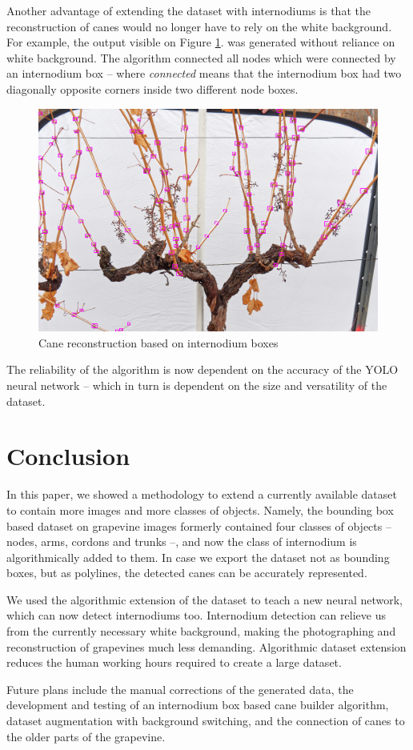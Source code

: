 \documentclass{PSAIE}%
\begin{document}
Another advantage of extending the dataset with internodiums is that the reconstruction of canes
would no longer have to rely on the white background. For example, the output visible on Figure
\ref{fig_internodium_connections}. was generated without reliance on white background. The algorithm
connected all nodes which were connected by an internodium box -- where \textit{connected} means that the
internodium box had two diagonally opposite corners inside two different node boxes.

\begin{figure}[h]
      \centering
      \includegraphics[scale=0.23]{images/internodium_connections.png}
      \caption{Cane reconstruction based on internodium boxes}
      \label{fig_internodium_connections}
\end{figure}

The reliability of the algorithm is now dependent on the accuracy of the YOLO neural network -- which in
turn is dependent on the size and versatility of the dataset.

\section{Conclusion} \label{sec_conclusion}
In this paper, we showed a methodology to extend a currently available dataset to contain more images and
more classes of objects. Namely, the bounding box based dataset on grapevine images formerly contained
four classes of objects -- nodes, arms, cordons and trunks --, and now the class of internodium is
algorithmically added to them. In case we export the dataset not as bounding boxes, but as polylines,
the detected canes can be accurately represented.

We used the algorithmic extension of the dataset to teach a new neural network, which can now detect
internodiums too. Internodium detection can relieve us from the currently necessary white background,
making the photographing and reconstruction of grapevines much less demanding. Algorithmic dataset
extension reduces the human working hours required to create a large dataset.

Future plans include the manual corrections of the generated data, the development and testing of an
internodium box based cane builder algorithm, dataset augmentation with background switching, and
the connection of canes to the older parts of the grapevine.



\end{document}
